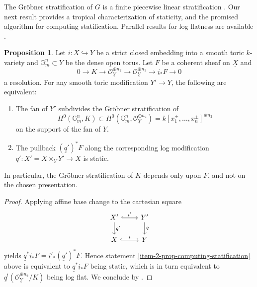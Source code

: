 \documentclass[11pt]{amsart}
\theoremstyle{definition}
\theoremstyle{definition}
\newtheorem{proposition}[theorem]{Proposition}
\newcommand{\cO}{\mathcal{O}}
\newcommand{\cal}{\mathcal}
\def\cO{{\cal O}}
\begin{document}
The Gröbner stratification of $G$ is a finite piecewise linear stratification \cite{Cartwright,kennedy2023logarithmic}. Our next result provides a tropical characterization of staticity, and the promised algorithm for computing statification. Parallel results for log flatness are available \cite[Theorem~B]{kennedy2025logarithmic}.

\begin{proposition}\label{prop:computing statification}
Let $i\colon X\hookrightarrow Y$ be a strict closed embedding into a smooth toric $k$-variety and $\mathbb{G}_m^{n} \subset Y$ be the dense open torus. Let $F$ be a coherent sheaf on $\underline{X}$ and
$$0\longrightarrow K\longrightarrow\mathcal{O}_{\underline{Y}}^{\oplus n_2}\longrightarrow\mathcal{O}_{\underline{Y}}^{\oplus n_1}\longrightarrow \underline{i}{}_{*}F\longrightarrow 0$$ a resolution. For any smooth toric modification $Y'\rightarrow Y$, the following are equivalent:
\begin{enumerate}
\item\label{item-1-prop-computing-statification} The fan of $Y'$ subdivides the Gröbner stratification of $$H^0(\mathbb{G}_m^n,K)\subset H^0(\mathbb{G}_m^n,\cO_{\underline{Y}}^{\oplus n_2}) = k[x_1^{\pm},\ldots,x_n^{\pm}]^{\oplus n_2}$$ on the support of the fan of $Y$.
\item \label{item-2-prop-computing-statification}
The pullback $(\underline{q}')^*F$ along the corresponding log modification $q'\colon X' = X\times_Y Y'\rightarrow X$ is static.
\end{enumerate}
In particular, the Gr\"obner stratification of $K$ depends only upon $F$, and not on the chosen presentation.
\end{proposition}   
\begin{proof}
Applying affine base change \cite[02KG]{stacks} to the cartesian square
\begin{equation*}
\begin{tikzcd}
    X'\dar["q'"]\rar["i'",hook] &Y'\dar["q"]\\
    X\rar["i",hook] &Y 
\end{tikzcd}
\end{equation*}
yields $\underline{q}^*\underline{i}{}_*F = \underline{i}{}'_*(\underline{q}')^*F$. Hence statement \eqref{item-2-prop-computing-statification} above is equivalent to $\underline{q}^*\underline{i}{}_*F$ being static, which is in turn equivalent to $\underline{q}^{!}(\cO_{\underline{Y}}^{\oplus n_2}/K)$ being log flat. We conclude by \cite[Theorem B]{kennedy2025logarithmic}.
\end{proof}
\end{document}
